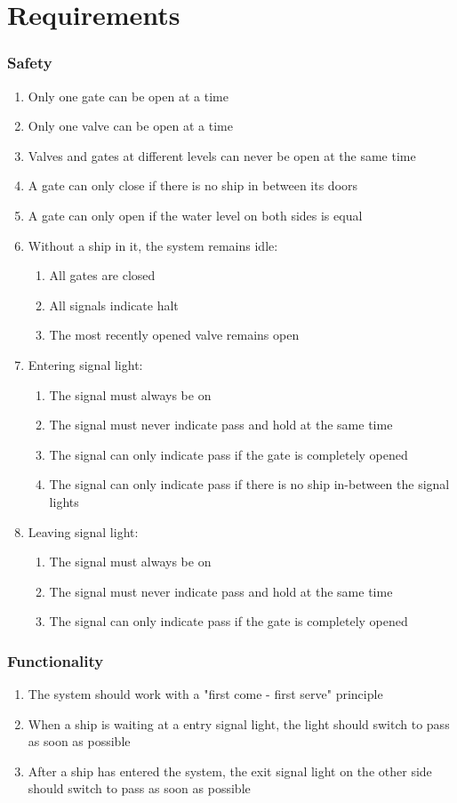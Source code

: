 \section{Requirements}
\subsubsection{Safety}
\begin{enumerate}
	\item Only one gate can be open at a time
	\item Only one valve can be open at a time
	\item Valves and gates at different levels can never be open at the same time	
	\item A gate can only close if there is no ship in between its doors
	\item A gate can only open if the water level on both sides is equal
	\item Without a ship in it, the system remains idle:
	\begin{enumerate}
		\item All gates are closed
		\item All signals indicate halt
		\item The most recently opened valve remains open
	\end{enumerate}
	\item Entering signal light:
	\begin{enumerate}
		\item The signal must always be on
		\item The signal must never indicate pass and hold at the same time
		\item The signal can only indicate pass if the gate is completely opened
		\item The signal can only indicate pass if there is no ship in-between the signal lights
	\end{enumerate}
	\item Leaving signal light:
	\begin{enumerate}
		\item The signal must always be on
		\item The signal must never indicate pass and hold at the same time
		\item The signal can only indicate pass if the gate is completely opened
	\end{enumerate}
\end{enumerate}
	
\subsubsection{Functionality}
\begin{enumerate}
	\item The system should work with a "first come - first serve" principle
	\item When a ship is waiting at a entry signal light, the light should switch to pass as soon as possible
	\item After a ship has entered the system, the exit signal light on the other side should switch to pass as soon as possible
\end{enumerate}

